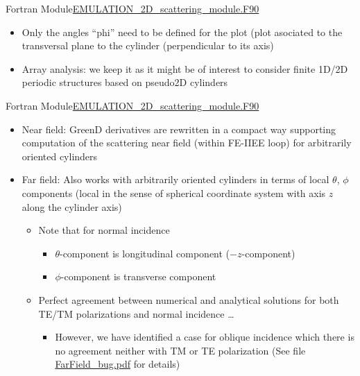 \begin{frame}{Fortran Module}{\url{EMULATION_2D_scattering_module.F90} }
\begin{itemize}
   \item Only the angles ``phi'' need to be defined for the plot (plot
     asociated to the transversal plane to the cylinder (perpendicular
     to its axis)

   \item Array analysis: we keep it as it might be of interest to
     consider finite 1D/2D periodic structures based on pseudo2D
     cylinders

   \end{itemize}


  \end{frame}

  


  \begin{frame}{Fortran Module}{\url{EMULATION_2D_scattering_module.F90} }

    \begin{itemize}
    \item Near field: {GreenD} derivatives are rewritten in a compact way
      supporting computation of the scattering near field (within
      FE-IIEE loop) for arbitrarily oriented cylinders

    \item Far field: Also works with arbitrarily oriented cylinders in
      terms of local $\theta$, $\phi$ components (local in the sense
      of spherical coordinate system with axis $z$ along the cylinder
      axis)
      \begin{itemize}
      \item Note that for normal incidence
        \begin{itemize}
        \item $\theta$-component is longitudinal component
          ($-z$-component) 
        \item $\phi$-component is transverse component
        \end{itemize}
      \item Perfect agreement between numerical and analytical
        solutions for both TE/TM polarizations and normal incidence \ldots
        \begin{itemize}
        \item However, we have \alert{identified a case for oblique
            incidence which there is no agreement neither with TM or TE
            polarization} (See file \url{FarField_bug.pdf} for details)
        \end{itemize}
      \end{itemize}
    \end{itemize}

  \end{frame}


  
